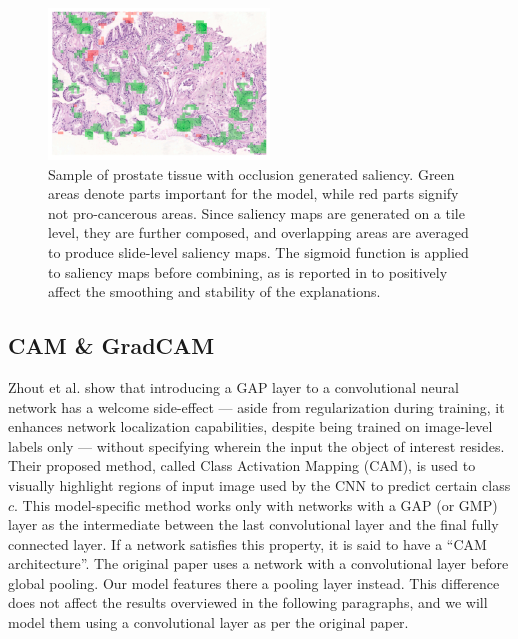 \begin{figure}[!h]
    \begin{center}
    \begin{minipage}{1\textwidth}
      \includegraphics[width=\textwidth]{img/occ-saliency.png}
    \end{minipage}
    \caption{Sample of prostate tissue with occlusion generated saliency. Green areas denote parts important for the model, while red parts signify not pro-cancerous areas. Since saliency maps are generated on a tile level, they are further composed, and overlapping areas are averaged to produce slide-level saliency maps. The sigmoid function is applied to saliency maps before combining, as is reported in \cite{gallo} to positively affect the smoothing and stability of the explanations.}
    \label{fig:occ-saliency}
    \end{center}
\end{figure}

\subsection{CAM \& GradCAM}\label{subsec:cam}

Zhout et al. \cite{cam} show that introducing a GAP layer to a convolutional neural network has a welcome side-effect --- aside from regularization during training, it enhances network localization capabilities, despite being trained on image-level labels only --- without specifying wherein the input the object of interest resides.
Their proposed method, called Class Activation Mapping (CAM), is used to visually highlight regions of input image used by the CNN to predict certain class $c$.
This model-specific method works only with networks with a GAP (or GMP) layer as the intermediate between the last convolutional layer and the final fully connected layer.
If a network satisfies this property, it is said to have a ``CAM architecture''.
The original paper uses a network with a convolutional layer before global pooling.
Our model features there a pooling layer instead.
This difference does not affect the results overviewed in the following paragraphs, and we will model them using a convolutional layer as per the original paper. 

